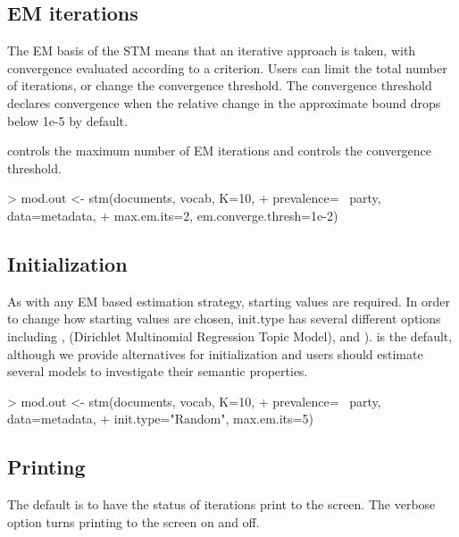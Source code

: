 \documentclass[nojss]{jss}
\begin{document}
\subsection{EM iterations}

The EM basis of the STM means that an iterative approach is taken, with convergence evaluated according to a criterion. Users can limit the total number of iterations, or change the convergence threshold. The convergence threshold declares convergence when the relative change in the approximate bound drops below 1e-5 by default.

 controls the maximum number of EM iterations and  controls the convergence threshold.

\begin{Schunk}
\begin{Sinput}
> mod.out <- stm(documents, vocab, K=10,
+                prevalence= ~party, data=metadata,
+                max.em.its=2, em.converge.thresh=1e-2)
\end{Sinput}
\end{Schunk}

\subsection{Initialization}

As with any EM based estimation strategy, starting values are required. In order to change how starting values are chosen, init.type has several different options including ,  (Dirichlet Multinomial Regression Topic Model),  and ).
 is the default, although we provide alternatives for initialization and users should estimate several models to investigate their semantic properties.

\begin{Schunk}
\begin{Sinput}
> mod.out <- stm(documents, vocab, K=10,
+                prevalence= ~party, data=metadata,
+                init.type="Random", max.em.its=5)
\end{Sinput}
\end{Schunk}


\subsection{Printing}

The default is to have the status of iterations print to the screen. The verbose option turns printing to the screen on and off.
\end{document}
